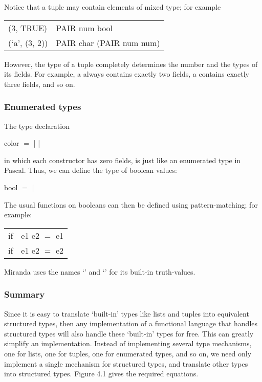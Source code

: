 Notice that a tuple may contain elements of mixed type; for example
\begin{mlcoded}
\begin{tabular}{ll}
    (3, TRUE) &\hastype{} PAIR num bool\\
    (`a', (3, 2)) &\hastype{} PAIR char (PAIR num num)
\end{tabular}
\end{mlcoded}
However, the type of a tuple completely determines the number and the types
of its fields. For example, a  always contains exactly two fields, a 
contains exactly three fields, and so on.

\subsubsection{Enumerated types}

The type declaration

\begin{mlcoded}
    color \hastype$=$  |  | 
\end{mlcoded}
in which each constructor has zero fields, is just like an enumerated type in Pascal. Thus, we can define the type of boolean values:
\begin{mlcoded}
    bool \hastype$=$  | 
\end{mlcoded}

The usual functions on booleans can then be defined using pattern-matching; for example:
\begin{mlcoded}
    \begin{tabular}{ll}
    if \ml{TRUE} &e1 e2 $=$ e1\\
    if \ml{FALSE} &e1 e2 $=$ e2
    \end{tabular}
\end{mlcoded}

Miranda uses the names `' and `' for its built-in truth-values.

\subsubsection{Summary}

Since it is easy to translate `built-in' types like lists and tuples into equivalent structured types, then any implementation of a functional language that handles structured types will also handle these `built-in' types for free. This can greatly simplify an implementation. Instead of implementing several type mechanisms, one for lists, one for tuples, one for enumerated types, and so on, we need only implement a single mechanism for structured types, and translate other types into structured types. Figure 4.1 gives the required equations.

